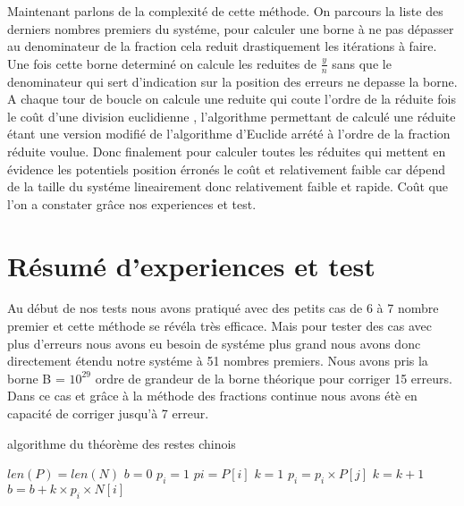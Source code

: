 \documentclass[a4paper, 11pt]{report}
\begin{document}
Maintenant parlons de la complexité de cette méthode. 
On parcours la liste des derniers nombres premiers du systéme, pour calculer une borne à ne pas dépasser au denominateur de la fraction cela reduit drastiquement les itérations à faire.
Une fois cette borne determiné on calcule les reduites de  $\frac{y}{n}$ sans que le denominateur qui sert d'indication sur la position des erreurs ne depasse la borne.
A chaque tour de boucle on calcule une reduite qui coute l'ordre de la réduite fois le coût d'une division euclidienne  ,
l'algorithme permettant de calculé une réduite étant une version modifié de l'algorithme d'Euclide arrété à l'ordre de la fraction réduite voulue.
Donc finalement pour calculer toutes les réduites qui mettent en évidence les potentiels position érronés le coût et relativement faible car dépend de la taille du systéme lineairement donc relativement faible et rapide.
Coût que l'on a constater grâce  nos experiences et test.






\newpage
\section{Résumé d'experiences et test}
Au début de nos tests nous avons pratiqué avec des petits cas de 6 à 7 nombre premier et cette méthode se révéla très efficace.
Mais pour tester des cas avec plus d'erreurs nous avons eu besoin de systéme plus grand nous avons donc directement étendu notre systéme à 51 nombres premiers.
Nous avons pris la borne B = $10^{29}$ ordre de grandeur de la borne théorique pour corriger 15 erreurs.
Dans ce cas et grâce à la méthode des fractions continue nous avons étè en capacité de corriger jusqu'à 7 erreur.



\newpage

\begin{appendices}
    \begin{algorithm}
        \caption{algorithme du théorème des restes chinois}
        \begin{algorithmic}
            \REQUIRE $len(P)=len(N)$
            \STATE $b=0$
            \STATE $p_i=1$
            \STATE $pi=P[i]$
            \STATE $k=1$
            \STATE $p_i=p_i\times P[j]$
            \ENDIF
            \ENDFOR
            \STATE $k=k+1$
            \ENDWHILE
            \STATE $b=b+k\times p_i \times N[i] $
            \ENDFOR
        \end{algorithmic}
    \end{algorithm}
\end{appendices}
\end{document}
